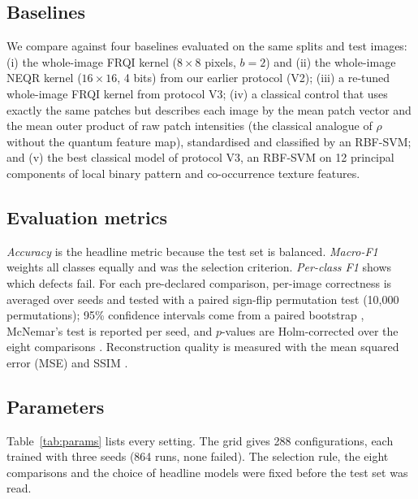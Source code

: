\documentclass[12pt,onecolumn,draftclsnofoot]{IEEEtran}
\begin{document}
\subsection{Baselines}
We compare against four baselines evaluated on the same splits and test images: (i) the whole-image FRQI kernel ($8\times8$ pixels, $b=2$) and (ii) the whole-image NEQR kernel ($16\times16$, 4 bits) from our earlier protocol (V2); (iii) a re-tuned whole-image FRQI kernel from protocol V3; (iv) a classical control that uses exactly the same patches but describes each image by the mean patch vector and the mean outer product of raw patch intensities (the classical analogue of $\rho$ without the quantum feature map), standardised and classified by an RBF-SVM; and (v) the best classical model of protocol V3, an RBF-SVM on 12 principal components of local binary pattern \cite{ojala2002lbp} and co-occurrence \cite{haralick1973glcm} texture features.

\subsection{Evaluation metrics}
\emph{Accuracy} is the headline metric because the test set is balanced. \emph{Macro-F1} weights all classes equally and was the selection criterion. \emph{Per-class F1} shows which defects fail. For each pre-declared comparison, per-image correctness is averaged over seeds and tested with a paired sign-flip permutation test (10,000 permutations); 95\% confidence intervals come from a paired bootstrap \cite{efron1993}, McNemar's test \cite{mcnemar1947} is reported per seed, and $p$-values are Holm-corrected over the eight comparisons \cite{holm1979}. Reconstruction quality is measured with the mean squared error (MSE) and SSIM \cite{wang2004ssim}.

\subsection{Parameters}
Table~\ref{tab:params} lists every setting. The grid gives 288 configurations, each trained with three seeds (864 runs, none failed). The selection rule, the eight comparisons and the choice of headline models were fixed before the test set was read.
\end{document}
